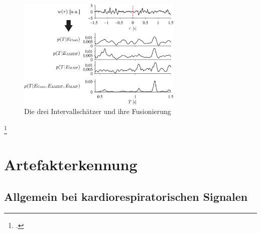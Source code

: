 	\begin{figure}[H]
		\centering
		\includegraphics[width=0.7\textwidth]{pic/estimator-fusion.png}
		\caption[Intervallschätzer nach \citeauthor{Bruser2013}]{Die drei Intervallschätzer und ihre Fusionierung}
		\label{fig:estimator-fusion}
	\end{figure}
	
	\footcites[Vgl. zu diesem Absatz][]{Bruser2013}{Zink2017}

\section{Artefakterkennung}

	\subsection{Allgemein bei kardiorespiratorischen Signalen}

